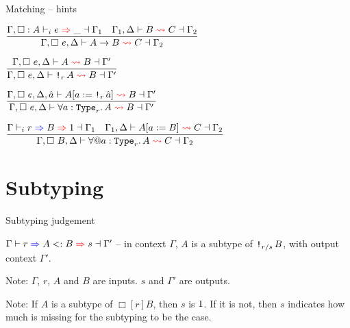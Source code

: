 \documentclass{beamer}
\begin{document}
\begin{frame}{Matching -- hints}

\begin{center}
  $\infrule{\infer{\Gamma, \typehint{A}}{e}{\_}{\Gamma_1} \quad \matching{\Gamma_1, \Delta}{B}{C}{\Gamma_2}}{\matching{\Gamma, \arghint{e}, \Delta}{\Fun{A}{B}}{C}{\Gamma_2}}$

  \vspace{2em}

  $\infrule{\matching{\Gamma, \arghint{e}, \Delta}{A}{B}{\Gamma'}}{\matching{\Gamma, \arghint{e}, \Delta}{\Box[r]{A}}{B}{\Gamma'}}$

  \vspace{2em}

  $\infrule{\matching{\Gamma, \arghint{e}, \Delta, \evar{a}}{\subst{A}{a}{\Box[r]{\evar{a}}}}{B}{\Gamma'}}{\matching{\Gamma, \arghint{e}, \Delta}{\ForallI{a}[r]{A}}{B}{\Gamma'}}$

  \vspace{2em}

  $\infrule{\newkinding{\Gamma}{r}{B}{\One}{\Gamma_1} \quad \matching{\Gamma_1, \Delta}{\subst{A}{a}{B}}{C}{\Gamma_2}}{\matching{\Gamma, \typearghint{B}, \Delta}{\ForallE{a}[r]{A}}{C}{\Gamma_2}}$
\end{center}

\end{frame}

\section{Subtyping}

\begin{frame}{Subtyping judgement}

$\subtyping{\Gamma}{r}{A}{B}{s}{\Gamma'}$ -- in context $\Gamma$, $A$ is a subtype of $\Box[\divqty{r}{s}]{B}$, with output context $\Gamma'$.

\vspace{2em}

Note: $\Gamma$, $r$, $A$ and $B$ are inputs. $s$ and $\Gamma'$ are outputs.

\vspace{2em}

Note: If $A$ is a subtype of $\Box[r]{B}$, then $s$ is $1$. If it is not, then $s$ indicates how much is missing for the subtyping to be the case.

\end{frame}
\end{document}
